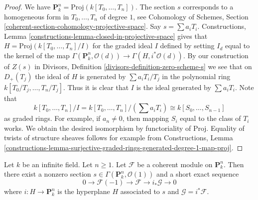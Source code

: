 \begin{proof}
We have $\mathbf{P}^n_k = \text{Proj}(k[T_0, \ldots, T_n])$.
The section $s$ corresponds to a homogeneous form in $T_0, \ldots, T_n$
of degree $1$, see
Cohomology of Schemes, Section
\ref{coherent-section-cohomology-projective-space}.
Say $s = \sum a_i T_i$.
Constructions, Lemma \ref{constructions-lemma-closed-in-projective-space}
gives that
$H = \text{Proj}(k[T_0, \ldots, T_n]/I)$ for the graded ideal $I$
defined by setting $I_d$ equal to the kernel of the map
$\Gamma(\mathbf{P}^n_k, \mathcal{O}(d)) \to \Gamma(H, i^*\mathcal{O}(d))$.
By our construction of $Z(s)$ in Divisors, 
Definition \ref{divisors-definition-zero-scheme-s}
we see that on $D_{+}(T_j)$ the ideal of $H$ is generated by
$\sum a_i T_i/T_j$ in the polynomial ring
$k[T_0/T_j, \ldots, T_n/T_j]$. Thus it is clear that $I$ is the ideal
generated by $\sum a_i T_i$. Note that
$$
k[T_0, \ldots, T_n]/I = k[T_0, \ldots, T_n]/(\sum a_i T_i) \cong
k[S_0, \ldots, S_{n - 1}]
$$
as graded rings. For example, if $a_n \not = 0$, then mapping
$S_i$ equal to the class of $T_i$ works. We obtain the desired isomorphism
by functoriality of $\text{Proj}$.
Equality of twists of structure sheaves follows for example from
Constructions, Lemma
\ref{constructions-lemma-surjective-graded-rings-generated-degree-1-map-proj}.
\end{proof}

\begin{lemma}
\label{lemma-exact-sequence-induction}
Let $k$ be an infinite field. Let $n \geq 1$.
Let $\mathcal{F}$ be a coherent module on $\mathbf{P}^n_k$.
Then there exist a nonzero section
$s \in \Gamma(\mathbf{P}^n_k, \mathcal{O}(1))$
and a short exact sequence
$$
0 \to \mathcal{F}(-1) \to \mathcal{F} \to i_*\mathcal{G} \to 0
$$
where $i : H \to \mathbf{P}^n_k$ is the hyperplane $H$ associated to $s$
and $\mathcal{G} = i^*\mathcal{F}$.
\end{lemma}

